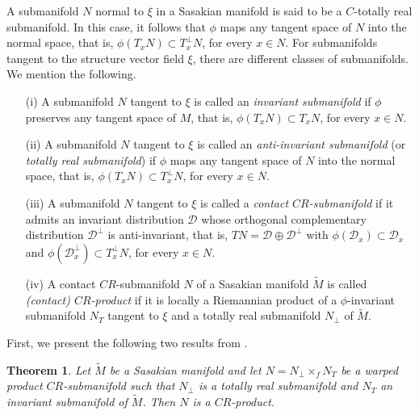 \documentclass{amsart}
\theoremstyle{plain}
\newtheorem{theorem}{Theorem}[section]
\numberwithin{equation}{section}
\theoremstyle{remark}
\numberwithin{equation}{section}
\begin{document}
A submanifold $N$ normal to $\xi$ in a Sasakian manifold is said to be a $C$-totally real
submanifold. In this case, it follows that $\phi$ maps any tangent space of $N$ into the normal space, that is, $\phi(T_{x}N)\subset T^{\perp}_{x}N$, for every $x\in N$.
For submanifolds tangent to the structure vector field $\xi$, there are different classes
of submanifolds. We mention the following.

\begin{enumerate}
\item[(i)] A submanifold $N$ tangent to $\xi$ is called an {\it invariant submanifold} if $\phi$ preserves any tangent space of $M$, that is, $\phi(T_{x}N)\subset T_{x}N$, for every $x\in N$.

\item[(ii)] A submanifold $N$ tangent to $\xi$ is called an {\it anti-invariant submanifold} (or {\it totally real submanifold}) if $\phi$ maps any tangent space of $N$ into the normal space, that is, $\phi(T_{x}N)\subset T^{\perp}_{x}N$, for every $x\in N$.

\item[(iii)] A submanifold $N$ tangent to $\xi$ is called a {\it contact $CR$-submanifold} if it admits
an invariant distribution $\mathcal D$ whose orthogonal complementary distribution ${\mathcal D}^{\perp}$ is anti-invariant, that is, $TN= {\mathcal D} \oplus \mathcal D^{\perp}$ with $\phi(\mathcal D_{x})\subset \mathcal D_{x}$ and $\phi(\mathcal D_{x}^{\perp})\subset T_{x}^{\perp}N$, for every $x\in N$.

\item[(iv)] A contact $CR$-submanifold $N$ of a Sasakian manifold $\tilde M$ is called {\it (contact)
$CR$-product} if it is locally a Riemannian product of a $\phi$-invariant submanifold $N_{T}$ tangent to $\xi$ and a totally real submanifold $N_{\perp}$ of $\tilde M$.\end{enumerate}

First, we present the following two results from \cite{HM03,Mu05}.

\begin{theorem}\label{T:16.1} Let $\tilde M$ be a Sasakian manifold and let  $N=N_{\perp}\times_{f} N_{T}$ be a warped product $CR$-submanifold  such that $N_{\perp}$ is a totally real submanifold and $N_{T}$ an invariant submanifold of $\tilde M$. Then $N$ is a $CR$-product.
\end{theorem}
\end{document}

